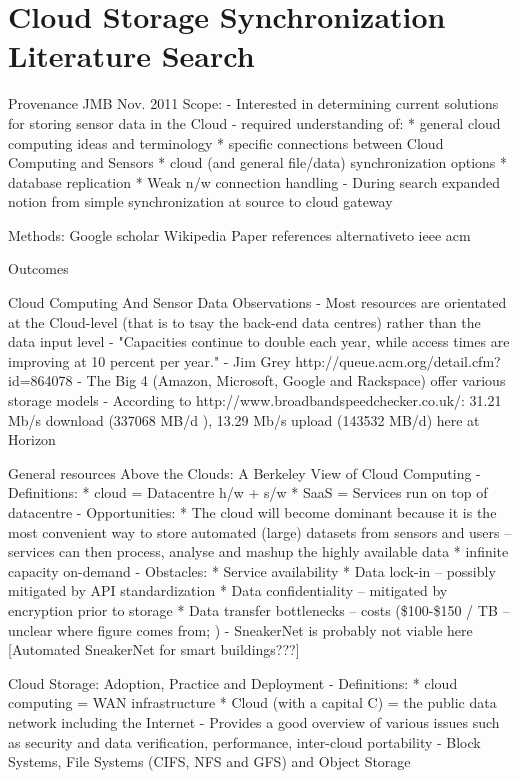 \section{Cloud Storage Synchronization Literature Search}

Provenance
	JMB
	Nov. 2011
	Scope: 
		- Interested in determining current solutions for storing sensor data in the Cloud
		- required understanding of:
			* general cloud computing ideas and terminology
			* specific connections between Cloud Computing and Sensors
			* cloud (and general file/data) synchronization options
			* database replication
			* Weak n/w connection handling
		- During search expanded notion from simple synchronization at source to cloud gateway

	Methods:
			Google scholar
			Wikipedia
			Paper references
			alternativeto
			ieee
			acm

Outcomes			
	
	Cloud Computing And Sensor Data
		Observations
			- Most resources are orientated at the Cloud-level (that is to tsay the back-end data centres) rather than the data input level
			- "Capacities continue to double each year, while access times are improving at 10 percent per year." - Jim Grey http://queue.acm.org/detail.cfm?id=864078
			- The Big 4 (Amazon, Microsoft, Google and Rackspace) offer various storage models
			- According to http://www.broadbandspeedchecker.co.uk/: 31.21 Mb/s download (337068 MB/d ), 13.29 Mb/s upload (143532 MB/d) here at Horizon
		
		General resources
			Above the Clouds: A Berkeley View of Cloud Computing
				- Definitions: 	* cloud = Datacentre h/w + s/w
								* SaaS = Services run on top of datacentre
				- Opportunities:	* The cloud will become dominant because it is the most convenient way to store automated (large) datasets from sensors and users -- services can then process, analyse and mashup the highly available data 
									* infinite capacity on-demand
				- Obstacles:	* Service availability
								* Data lock-in -- possibly mitigated by API standardization
								* Data confidentiality -- mitigated by encryption prior to storage
								* Data transfer bottlenecks -- costs (\$100-\$150 / TB -- unclear where figure comes from; )
																- SneakerNet is probably not viable here [Automated SneakerNet for smart buildings???]
			
			Cloud Storage: Adoption, Practice and Deployment
				- Definitions: 	* cloud computing = WAN infrastructure
								* Cloud (with a capital C) = the public data network including the Internet
				- Provides a good overview of various issues such as security and data verification, performance, inter-cloud portability
				- Block Systems, File Systems (CIFS, NFS and GFS) and Object Storage



